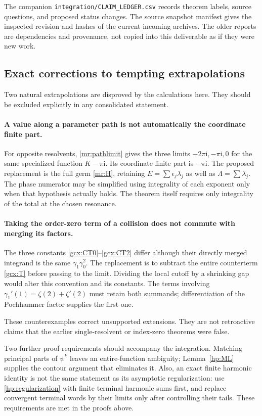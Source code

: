 \documentclass[11pt]{article}
\numberwithin{equation}{section}
\theoremstyle{plain}
\theoremstyle{definition}
\theoremstyle{remark}
\newcommand{\ii}{\mathrm i}
\newcommand{\src}[1]{\texttt{\small\nolinkurl{#1}}}
\begin{document}
The companion \src{integration/CLAIM_LEDGER.csv} records theorem labels,
source questions, and proposed status changes. The source snapshot
manifest gives the inspected revision and hashes of the current incoming
archives. The older reports are dependencies and provenance, not copied
into this deliverable as if they were new work.

\subsection{Exact corrections to tempting extrapolations}

Two natural extrapolations are disproved by the calculations here.
They should be excluded explicitly in any consolidated statement.

\paragraph{A value along a parameter path is not automatically the
coordinate finite part.}
For opposite resolvents, \eqref{mr:pathlimit} gives the three limits
$-2\pi\ii,-\pi\ii,0$ for the same specialized function $K-\pi\ii$.
Its coordinate finite part is $-\pi\ii$.
The proposed replacement is the full germ \eqref{mr:H}, retaining
$E=\sum\epsilon_j\lambda_j$ as well as $\Lambda=\sum\lambda_j$.
The phase numerator may be simplified using integrality of each exponent
only when that hypothesis actually holds. The theorem itself requires
only integrality of the total at the chosen resonance.

\paragraph{Taking the order-zero term of a collision does not commute
with merging its factors.}
The three constants \eqref{gcx:CT0}--\eqref{gcx:CT2} differ although
their directly merged integrand is the same
$\gamma_1\gamma_0^2$. The replacement is to subtract the entire
counterterm \eqref{gcx:T} before passing to the limit. Dividing the local
cutoff by a shrinking gap would alter this convention and its constants.
The terms involving
$\gamma_1'(1)=\zeta(2)+\zeta'(2)$ must retain both summands;
differentiation of the Pochhammer factor supplies the first one.

These counterexamples correct unsupported extensions. They are not
retroactive claims that the earlier single-resolvent or index-zero
theorems were false.

Two further proof requirements should accompany the integration.
Matching principal parts of $\psi^k$ leaves an entire-function
ambiguity; Lemma~\ref{hp:ML} supplies the contour argument that eliminates
it. Also, an exact finite harmonic identity is not the same statement as
its asymptotic regularization: use \eqref{hp:regularization} with finite
terminal harmonic sums first, and replace convergent terminal words by
their limits only after controlling their tails. These requirements are
met in the proofs above.
\end{document}

